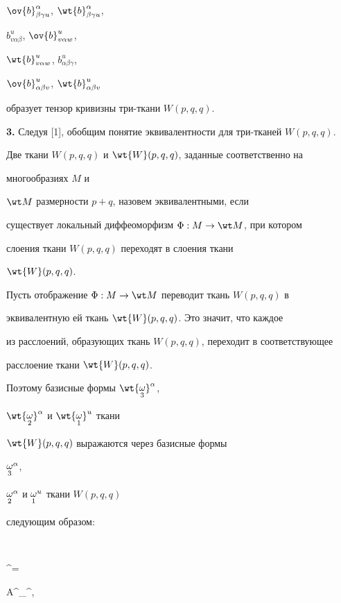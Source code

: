 $\ov{b}^{\alpha}_{\beta \gamma u}$, $\wt{b}^{\alpha}_{\beta \gamma u}$,


$b^{u}_{v \alpha \beta}$, $\ov{b}^{u}_{v \alpha w}$,


$\wt{b}^{u}_{v \alpha w}$, $b^{u}_{\alpha \beta \gamma}$,


$\ov{b}^{u}_{\alpha \beta v}$, $\wt{b}^{u}_{\alpha \beta v}$


образует тензор кривизны три-ткани $W(p,q,q)$.


\medskip








{\bf 3.} Следуя [1], обобщим понятие эквивалентности для три-тканей $W(p,q,q)$.





Две ткани $W(p,q,q)$ и $\wt{W}(p,q,q)$, заданные соответственно на


многообразиях $M$ и


$\wt M$ размерности $p+q$, назовем эквивалентными, если


существует локальный диффеоморфизм $\Phi: M \rightarrow \wt M$, при котором


слоения ткани $W(p,q,q)$ переходят в слоения ткани


$\wt{W}(p,q,q)$.





Пусть отображение $\Phi: M \rightarrow \wt M$ переводит ткань $W(p,q,q)$ в


эквивалентную ей ткань $\wt{W}(p,q,q)$. Это значит, что каждое


из расслоений, образующих ткань $W(p,q,q)$, переходит в соответствующее


расслоение ткани $\wt{W}(p,q,q)$.


Поэтому базисные формы $\wt{\crazy{\omega}{3}}^{\alpha}$,


$\wt{\crazy{\omega}{2}}^{\alpha}$ и $\wt{\crazy{\omega}{1}}^{u}$ ткани


$\wt{W}(p,q,q)$ выражаются через базисные формы


${\displaystyle{\mathop{\omega}_{3}}}^{\alpha}$,


${\displaystyle{\mathop{\omega}_{2}}}^{\alpha}$ и ${\displaystyle{\mathop{\omega}_{1}}}^{u}$ ткани $W(p,q,q)$


следующим образом:


$$


^{\alpha}=


A^{\alpha}_{\beta}{}^{\beta}, \quad


